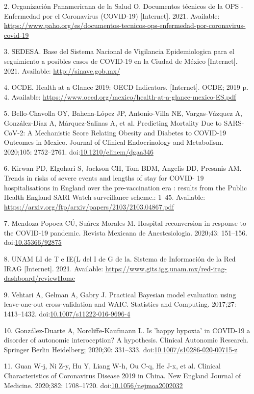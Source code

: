 \documentclass[10pt,letterpaper]{article}
\begin{document}
\hypertarget{ref-OrganizacionPanamericanadelaSalud2021}{}
2. Organización Panamericana de la Salud O. Documentos técnicos de la
OPS - Enfermedad por el Coronavirus (COVID-19) {[}Internet{]}. 2021.
Available:
\url{https://www.paho.org/es/documentos-tecnicos-ops-enfermedad-por-coronavirus-covid-19}

\hypertarget{ref-SEDESA2021}{}
3. SEDESA. Base del Sistema Nacional de Vigilancia Epidemiologica para
el seguimiento a posibles casos de COVID-19 en la Ciudad de México
{[}Internet{]}. 2021. Available: \url{http://sinave.gob.mx/}

\hypertarget{ref-OCDE2019}{}
4. OCDE. Health at a Glance 2019: OECD Indicators. {[}Internet{]}. OCDE;
2019 p. 4. Available:
\url{https://www.oecd.org/mexico/health-at-a-glance-mexico-ES.pdf}

\hypertarget{ref-Bello-Chavolla2020}{}
5. Bello-Chavolla OY, Bahena-López JP, Antonio-Villa NE, Vargas-Vázquez
A, González-Díaz A, Márquez-Salinas A, et al. Predicting Mortality Due
to SARS-CoV-2: A Mechanistic Score Relating Obesity and Diabetes to
COVID-19 Outcomes in Mexico. Journal of Clinical Endocrinology and
Metabolism. 2020;105: 2752--2761.
doi:\href{https://doi.org/10.1210/clinem/dgaa346}{10.1210/clinem/dgaa346}

\hypertarget{ref-Kirwan}{}
6. Kirwan PD, Elgohari S, Jackson CH, Tom BDM, Angelis DD, Presanis AM.
Trends in risks of severe events and lengths of stay for COVID- 19
hospitalisations in England over the pre-vaccination era : results from
the Public Health England SARI-Watch surveillance scheme.: 1--45.
Available: \url{https://arxiv.org/ftp/arxiv/papers/2103/2103.04867.pdf}

\hypertarget{ref-Mendoza-Popoca2020}{}
7. Mendoza-Popoca CÚ, Suárez-Morales M. Hospital reconversion in
response to the COVID-19 pandemic. Revista Mexicana de Anestesiologia.
2020;43: 151--156.
doi:\href{https://doi.org/10.35366/92875}{10.35366/92875}

\hypertarget{ref-UNAM2021}{}
8. UNAM LI de T e IE(L del I de G de la. Sistema de Información de la
Red IRAG {[}Internet{]}. 2021. Available:
\url{https://www.gits.igg.unam.mx/red-irag-dashboard/reviewHome}

\hypertarget{ref-Vehtari2017}{}
9. Vehtari A, Gelman A, Gabry J. Practical Bayesian model evaluation
using leave-one-out cross-validation and WAIC. Statistics and Computing.
2017;27: 1413--1432.
doi:\href{https://doi.org/10.1007/s11222-016-9696-4}{10.1007/s11222-016-9696-4}

\hypertarget{ref-Gonzalez-Duarte2020}{}
10. González-Duarte A, Norcliffe-Kaufmann L. Is 'happy hypoxia' in
COVID-19 a disorder of autonomic interoception? A hypothesis. Clinical
Autonomic Research. Springer Berlin Heidelberg; 2020;30: 331--333.
doi:\href{https://doi.org/10.1007/s10286-020-00715-z}{10.1007/s10286-020-00715-z}

\hypertarget{ref-Guan2020}{}
11. Guan W-j, Ni Z-y, Hu Y, Liang W-h, Ou C-q, He J-x, et al. Clinical
Characteristics of Coronavirus Disease 2019 in China. New England
Journal of Medicine. 2020;382: 1708--1720.
doi:\href{https://doi.org/10.1056/nejmoa2002032}{10.1056/nejmoa2002032}

\nolinenumbers
\end{document}
